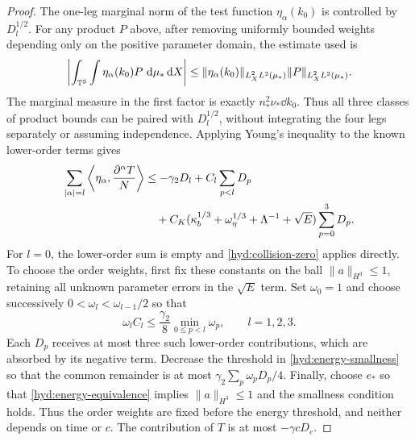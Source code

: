 \begin{proof}
 The one-leg marginal norm of the test function $\eta_\alpha(k_0)$ is
 controlled by $D_l^{1/2}$. For any product $P$ above, after removing
 uniformly bounded weights depending only on the positive parameter
 domain, the estimate used is
 \[
 \left|\int_{\mathbb T^3}\int\eta_\alpha(k_0)P\,\,\mathrm d\mu_*\,\mathrm d X\right|
 \le \|\eta_\alpha(k_0)\|_{L_X^2L^2(\mu_*)}
                         \|P\|_{L_X^2L^2(\mu_*)}.
 \]
 The marginal measure in the first factor is exactly
 $n_*^2\nu_*\dd k_0$. Thus all three classes of product bounds can be
 paired with $D_l^{1/2}$, without integrating the four legs separately
 or assuming independence. Applying Young's inequality to the known
 lower-order terms gives
 \begin{align}
 \sum_{|\alpha|=l}\left\langle\eta_\alpha,
                          \frac{\partial^\alpha T}{N}\right\rangle
 &\le-\gamma_2D_l+C_l\sum_{p<l}D_p\notag\\
 &\quad+C_K(\kappa_b^{1/3}+\omega_\eta^{1/3}
                    +\Lambda^{-1}+\sqrt E)\sum_{p=0}^3D_p.
 \label{hyd:triangular-collision}
 \end{align}
 For $l=0$, the lower-order sum is empty and
 \eqref{hyd:collision-zero} applies directly. To choose the order
 weights, first fix these constants on the ball $\|a\|_{H^3}\le1$,
 retaining all unknown parameter errors in the $\sqrt E$ term.
 Set $\omega_0=1$ and choose successively
 $0<\omega_l<\omega_{l-1}/2$ so that
 \[
 \omega_l C_l\le\frac{\gamma_2}{8}
                  \min_{0\le p<l}\omega_p,\qquad l=1,2,3.
 \]
 Each $D_p$ receives at most three such lower-order contributions,
 which are absorbed by its negative term. Decrease the threshold in
 \eqref{hyd:energy-smallness} so that the common remainder is at most
 $\gamma_2\sum_p\omega_pD_p/4$. Finally, choose $e_*$ so that
 \eqref{hyd:energy-equivalence} implies $\|a\|_{H^3}\le1$ and the
 smallness condition holds. Thus the order weights are fixed before
 the energy threshold, and neither depends on time or $c$.
 The contribution of $T$ is at most $-\gamma cD_e$.


\end{proof}
